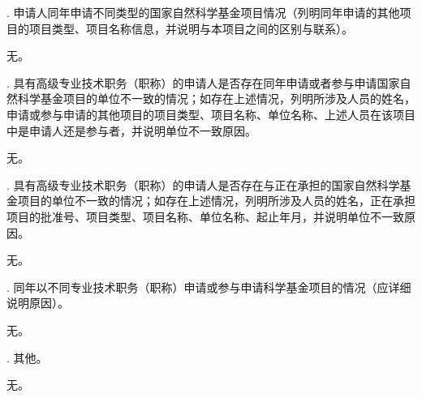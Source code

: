 \documentclass[12pt,UTF8,AutoFakeBold=3,a4paper]{ctexart} %
\newcommand{\sihao}{\fontsize{14pt}{\baselineskip}\selectfont}
\begin{document}
{\sihao \color{MsBlue} . 申请人同年申请不同类型的国家自然科学基金项目情况（列明同年申请的其他项目的项目类型、项目名称信息，并说明与本项目之间的区别与联系）。 }

\vspace{0.25 \baselineskip}
{\kaishu 无。}
\vspace{0.25 \baselineskip}

{\sihao \color{MsBlue} . 具有高级专业技术职务（职称）的申请人是否存在同年申请或者参与申请国家自然科学基金项目的单位不一致的情况；如存在上述情况，列明所涉及人员的姓名，申请或参与申请的其他项目的项目类型、项目名称、单位名称、上述人员在该项目中是申请人还是参与者，并说明单位不一致原因。}

\vspace{0.25 \baselineskip}
{\kaishu 无。}
\vspace{0.25 \baselineskip}

{\sihao \color{MsBlue} . 具有高级专业技术职务（职称）的申请人是否存在与正在承担的国家自然科学基金项目的单位不一致的情况；如存在上述情况，列明所涉及人员的姓名，正在承担项目的批准号、项目类型、项目名称、单位名称、起止年月，并说明单位不一致原因。}

\vspace{0.25 \baselineskip}
{\kaishu 无。}
\vspace{0.25 \baselineskip}

{\sihao \color{MsBlue} . 同年以不同专业技术职务（职称）申请或参与申请科学基金项目的情况（应详细说明原因）。}

\vspace{0.25 \baselineskip}
{\kaishu 无。}
\vspace{0.25 \baselineskip}

{\sihao \color{MsBlue} . 其他。}

\vspace{0.25 \baselineskip}
{\kaishu 无。}
\vspace{0.25 \baselineskip}
\end{document}
